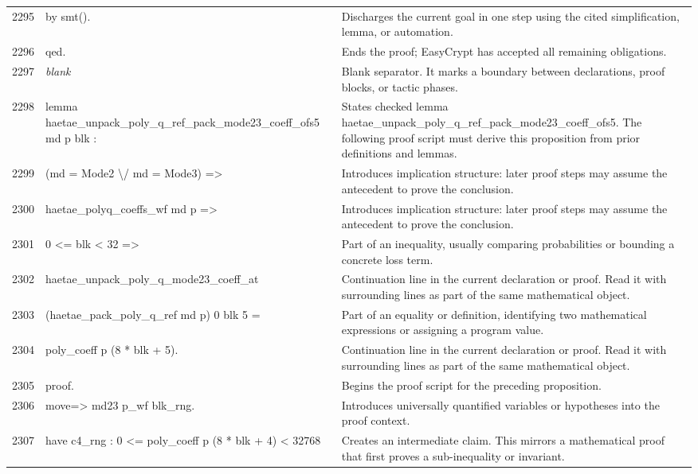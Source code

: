 \documentclass[10pt]{article}
\begin{document}
\begin{longtable}{r L{0.53\textwidth} L{0.37\textwidth}}
2295 & {\ttfamily\scriptsize by smt().} & Discharges the current goal in one step using the cited simplification, lemma, or automation. \\
2296 & {\ttfamily\scriptsize qed.} & Ends the proof; EasyCrypt has accepted all remaining obligations. \\
2297 & {\ttfamily\scriptsize \emph{blank}} & Blank separator.  It marks a boundary between declarations, proof blocks, or tactic phases. \\
2298 & {\ttfamily\scriptsize lemma haetae\_unpack\_poly\_q\_ref\_pack\_mode23\_coeff\_ofs5 md p blk :} & States checked lemma haetae\_unpack\_poly\_q\_ref\_pack\_mode23\_coeff\_ofs5.  The following proof script must derive this proposition from prior definitions and lemmas. \\
2299 & {\ttfamily\scriptsize   (md = Mode2 \textbackslash{}/ md = Mode3) =>} & Introduces implication structure: later proof steps may assume the antecedent to prove the conclusion. \\
2300 & {\ttfamily\scriptsize   haetae\_polyq\_coeffs\_wf md p =>} & Introduces implication structure: later proof steps may assume the antecedent to prove the conclusion. \\
2301 & {\ttfamily\scriptsize   0 <= blk < 32 =>} & Part of an inequality, usually comparing probabilities or bounding a concrete loss term. \\
2302 & {\ttfamily\scriptsize   haetae\_unpack\_poly\_q\_mode23\_coeff\_at} & Continuation line in the current declaration or proof.  Read it with surrounding lines as part of the same mathematical object. \\
2303 & {\ttfamily\scriptsize     (haetae\_pack\_poly\_q\_ref md p) 0 blk 5 =} & Part of an equality or definition, identifying two mathematical expressions or assigning a program value. \\
2304 & {\ttfamily\scriptsize   poly\_coeff p (8 * blk + 5).} & Continuation line in the current declaration or proof.  Read it with surrounding lines as part of the same mathematical object. \\
2305 & {\ttfamily\scriptsize proof.} & Begins the proof script for the preceding proposition. \\
2306 & {\ttfamily\scriptsize move=> md23 p\_wf blk\_rng.} & Introduces universally quantified variables or hypotheses into the proof context. \\
2307 & {\ttfamily\scriptsize have c4\_rng : 0 <= poly\_coeff p (8 * blk + 4) < 32768} & Creates an intermediate claim.  This mirrors a mathematical proof that first proves a sub-inequality or invariant. \\

\end{longtable}
\end{document}
